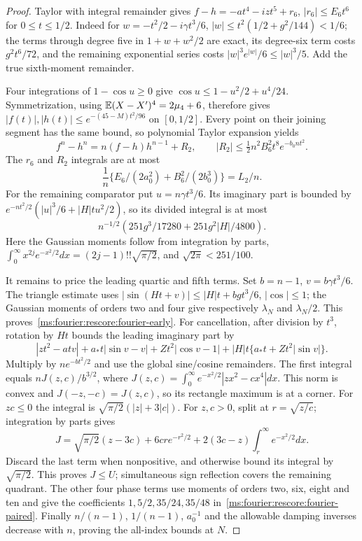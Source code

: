 \begin{proof}
Taylor with integral remainder gives
$f-h=-at^4-izt^5+r_6$, $|r_6|\le E_6t^6$ for $0\le t\le1/2$.
Indeed for $w=-t^2/2-i\gamma t^3/6$,
$|w|\le t^2(1/2+g^2/144)<1/6$; the terms through degree five in
$1+w+w^2/2$ are exact, its degree-six term costs $g^2t^6/72$, and
the remaining exponential series costs $|w|^3e^{|w|}/6\le|w|^3/5$.
Add the true sixth-moment remainder.

Four integrations of $1-\cos u\ge0$ give
$\cos u\le1-u^2/2+u^4/24$. Symmetrization, using
$\mathbb E(X-X')^4=2\mu_4+6$, therefore gives
$|f(t)|,|h(t)|\le e^{-(45-M)t^2/96}$ on $[0,1/2]$.
Every point on their joining segment has the same bound, so polynomial
Taylor expansion yields
\[
 f^n-h^n=n(f-h)h^{n-1}+R_2,\qquad
 |R_2|\le\tfrac12n^2B_6^2t^8e^{-b_0nt^2}.
\]
The $r_6$ and $R_2$ integrals are at most
\begin{equation}\label{ms:fourier:rescore:fourier-common-error}
 \frac1n\{E_6/(2a_0^2)+B_6^2/(2b_0^3)\}=L_2/n.
\end{equation}
For the remaining comparator put $u=n\gamma t^3/6$. Its imaginary part
is bounded by $e^{-nt^2/2}(|u|^3/6+|H|tu^2/2)$, so its divided integral
is at most
\begin{equation}\label{ms:fourier:rescore:fourier-comparator-low}
 n^{-1/2}(251g^3/17280+251g^2|H|/4800).
\end{equation}
Here the Gaussian moments follow from integration by parts,
$\int_0^\infty x^{2j}e^{-x^2/2}dx=(2j-1)!!\sqrt{\pi/2}$,
and $\sqrt{2\pi}<251/100$.

It remains to price the leading quartic and fifth terms. Set $b=n-1$,
$v=b\gamma t^3/6$. The triangle estimate uses
$|\sin(Ht+v)|\le|H|t+bg t^3/6$, $|\cos|\le1$; the Gaussian
moments of orders two and four give respectively $\lambda_N$ and
$\lambda_N/2$. This proves~\eqref{ms:fourier:rescore:fourier-early}.
For cancellation, after division by $t^3$, rotation by $Ht$ bounds the
leading imaginary part by
\[
 |zt^2-atv|+a_*t|\sin v-v|+Zt^2|\cos v-1|
       +|H|t\{a_*t+Zt^2|\sin v|\}.
\]
Multiply by $ne^{-bt^2/2}$ and use the global sine/cosine remainders.
The first integral equals $nJ(z,c)/b^{3/2}$, where
$J(z,c)=\int_0^\infty e^{-x^2/2}|zx^2-cx^4|dx$.
This norm is convex and $J(-z,-c)=J(z,c)$, so its rectangle maximum
is at a corner. For $zc\le0$ the integral is
$\sqrt{\pi/2}(|z|+3|c|)$. For $z,c>0$, split at $r=\sqrt{z/c}$;
integration by parts gives
\[
 J=\sqrt{\pi/2}(z-3c)+6cr e^{-r^2/2}
       +2(3c-z)\int_r^\infty e^{-x^2/2}dx.
\]
Discard the last term when nonpositive, and otherwise bound its integral
by $\sqrt{\pi/2}$. This proves $J\le U$; simultaneous sign reflection
covers the remaining quadrant. The other four phase terms use moments
of orders two, six, eight and ten and give the coefficients
$1,5/2,35/24,35/48$ in~\eqref{ms:fourier:rescore:fourier-paired}. Finally $n/(n-1)$,
$1/(n-1)$, $a_0^{-1}$ and the allowable damping inverses decrease with
$n$, proving the all-index bounds at $N$.
\end{proof}

